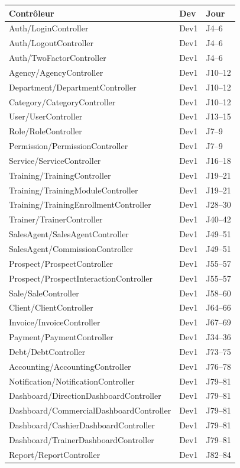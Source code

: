 \documentclass[12pt,a4paper]{report}
\begin{document}
\begin{longtable}{L{6cm} L{3cm} L{5cm}}
    \toprule
    \textbf{Contrôleur} & \textbf{Dev} & \textbf{Jour} \\
    \midrule
    \endhead
    Auth/LoginController & Dev1 & J4--6 \\
    Auth/LogoutController & Dev1 & J4--6 \\
    Auth/TwoFactorController & Dev1 & J4--6 \\
    Agency/AgencyController & Dev1 & J10--12 \\
    Department/DepartmentController & Dev1 & J10--12 \\
    Category/CategoryController & Dev1 & J10--12 \\
    User/UserController & Dev1 & J13--15 \\
    Role/RoleController & Dev1 & J7--9 \\
    Permission/PermissionController & Dev1 & J7--9 \\
    Service/ServiceController & Dev1 & J16--18 \\
    Training/TrainingController & Dev1 & J19--21 \\
    Training/TrainingModuleController & Dev1 & J19--21 \\
    Training/TrainingEnrollmentController & Dev1 & J28--30 \\
    Trainer/TrainerController & Dev1 & J40--42 \\
    SalesAgent/SalesAgentController & Dev1 & J49--51 \\
    SalesAgent/CommissionController & Dev1 & J49--51 \\
    Prospect/ProspectController & Dev1 & J55--57 \\
    Prospect/ProspectInteractionController & Dev1 & J55--57 \\
    Sale/SaleController & Dev1 & J58--60 \\
    Client/ClientController & Dev1 & J64--66 \\
    Invoice/InvoiceController & Dev1 & J67--69 \\
    Payment/PaymentController & Dev1 & J34--36 \\
    Debt/DebtController & Dev1 & J73--75 \\
    Accounting/AccountingController & Dev1 & J76--78 \\
    Notification/NotificationController & Dev1 & J79--81 \\
    Dashboard/DirectionDashboardController & Dev1 & J79--81 \\
    Dashboard/CommercialDashboardController & Dev1 & J79--81 \\
    Dashboard/CashierDashboardController & Dev1 & J79--81 \\
    Dashboard/TrainerDashboardController & Dev1 & J79--81 \\
    Report/ReportController & Dev1 & J82--84 \\
    \bottomrule
\end{longtable}
\end{document}
